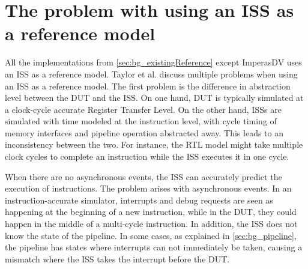 %
%        
%     
%        
%     
%     
%




\section{The problem with using an ISS as a reference model}
\label{sec:back_issProblem}

All the implementations from \cref{sec:bg_existingReference} except ImperasDV uses an ISS as a reference model. Taylor et al. discuss multiple problems when using an ISS as a reference model\cite{taylorAdvancedRISCVVerification2023}. The first problem is the difference in abstraction level between the DUT and the ISS. On one hand, DUT is typically simulated at a clock-cycle accurate Register Transfer Level. On the other hand, ISSs are simulated with time modeled at the instruction level, with cycle timing of memory interfaces and pipeline operation abstracted away. This leads to an inconsistency between the two. For instance, the RTL model might take multiple clock cycles to complete an instruction while the ISS executes it in one cycle.

When there are no asynchronous events, the ISS can accurately predict the execution of instructions. The problem arises with asynchronous events. In an instruction-accurate simulator, interrupts and debug requests are seen as happening at the beginning of a new instruction, while in the DUT, they could happen in the middle of a multi-cycle instruction. In addition, the ISS does not know the state of the pipeline. In some cases, as explained in \cref{sec:bg_pipeline}, the pipeline has states where interrupts can not immediately be taken, causing a mismatch where the ISS takes the interrupt before the DUT.



